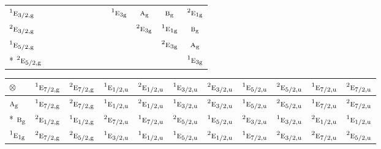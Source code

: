 \documentclass[10pt,a4paper]{article}
\numberwithin{equation}{section}
\newcommand{\irr}[1]{\text{\normalfont\scshape #1}}
\newcommand{\conjpair}[1]{{}^{#1}}
\newcommand{\ptag}[1]{\mathrm{#1}}
\newcommand{\irrprod}{\otimes}
\begin{document}
{\begin{longtable}{@{}lccccccccccc@{}}
$\conjpair{1}\irr{e}_{3/2,\ptag{g}}$ &  &  &  &  &  &  &  & $\conjpair{1}\irr{e}_{3\ptag{g}}$ & $\irr{a}_{\ptag{g}}$ & $\irr{b}_{\ptag{g}}$ & $\conjpair{2}\irr{e}_{1\ptag{g}}$\\
$\conjpair{2}\irr{e}_{3/2,\ptag{g}}$ &  &  &  &  &  &  &  &  & $\conjpair{2}\irr{e}_{3\ptag{g}}$ & $\conjpair{1}\irr{e}_{1\ptag{g}}$ & $\irr{b}_{\ptag{g}}$\\
$\conjpair{1}\irr{e}_{5/2,\ptag{g}}$ &  &  &  &  &  &  &  &  &  & $\conjpair{2}\irr{e}_{3\ptag{g}}$ & $\irr{a}_{\ptag{g}}$\\*
$\conjpair{2}\irr{e}_{5/2,\ptag{g}}$ &  &  &  &  &  &  &  &  &  &  & $\conjpair{1}\irr{e}_{3\ptag{g}}$\\
\bottomrule\end{longtable}}
{\small\setlength{\tabcolsep}{3pt}\begin{longtable}{@{}lcccccccccc@{}}\toprule
$\irrprod$ & $\conjpair{1}\irr{e}_{7/2,\ptag{g}}$ & $\conjpair{2}\irr{e}_{7/2,\ptag{g}}$ & $\conjpair{1}\irr{e}_{1/2,\ptag{u}}$ & $\conjpair{2}\irr{e}_{1/2,\ptag{u}}$ & $\conjpair{1}\irr{e}_{3/2,\ptag{u}}$ & $\conjpair{2}\irr{e}_{3/2,\ptag{u}}$ & $\conjpair{1}\irr{e}_{5/2,\ptag{u}}$ & $\conjpair{2}\irr{e}_{5/2,\ptag{u}}$ & $\conjpair{1}\irr{e}_{7/2,\ptag{u}}$ & $\conjpair{2}\irr{e}_{7/2,\ptag{u}}$\\\midrule\endhead
\bottomrule\endfoot\endlastfoot
$\irr{a}_{\ptag{g}}$ & $\conjpair{1}\irr{e}_{7/2,\ptag{g}}$ & $\conjpair{2}\irr{e}_{7/2,\ptag{g}}$ & $\conjpair{1}\irr{e}_{1/2,\ptag{u}}$ & $\conjpair{2}\irr{e}_{1/2,\ptag{u}}$ & $\conjpair{1}\irr{e}_{3/2,\ptag{u}}$ & $\conjpair{2}\irr{e}_{3/2,\ptag{u}}$ & $\conjpair{1}\irr{e}_{5/2,\ptag{u}}$ & $\conjpair{2}\irr{e}_{5/2,\ptag{u}}$ & $\conjpair{1}\irr{e}_{7/2,\ptag{u}}$ & $\conjpair{2}\irr{e}_{7/2,\ptag{u}}$\\*
$\irr{b}_{\ptag{g}}$ & $\conjpair{2}\irr{e}_{1/2,\ptag{g}}$ & $\conjpair{1}\irr{e}_{1/2,\ptag{g}}$ & $\conjpair{2}\irr{e}_{7/2,\ptag{u}}$ & $\conjpair{1}\irr{e}_{7/2,\ptag{u}}$ & $\conjpair{2}\irr{e}_{5/2,\ptag{u}}$ & $\conjpair{1}\irr{e}_{5/2,\ptag{u}}$ & $\conjpair{2}\irr{e}_{3/2,\ptag{u}}$ & $\conjpair{1}\irr{e}_{3/2,\ptag{u}}$ & $\conjpair{2}\irr{e}_{1/2,\ptag{u}}$ & $\conjpair{1}\irr{e}_{1/2,\ptag{u}}$\\
$\conjpair{1}\irr{e}_{1\ptag{g}}$ & $\conjpair{2}\irr{e}_{7/2,\ptag{g}}$ & $\conjpair{2}\irr{e}_{5/2,\ptag{g}}$ & $\conjpair{1}\irr{e}_{3/2,\ptag{u}}$ & $\conjpair{1}\irr{e}_{1/2,\ptag{u}}$ & $\conjpair{1}\irr{e}_{5/2,\ptag{u}}$ & $\conjpair{2}\irr{e}_{1/2,\ptag{u}}$ & $\conjpair{1}\irr{e}_{7/2,\ptag{u}}$ & $\conjpair{2}\irr{e}_{3/2,\ptag{u}}$ & $\conjpair{2}\irr{e}_{7/2,\ptag{u}}$ & $\conjpair{2}\irr{e}_{5/2,\ptag{u}}$\\

\end{longtable}}
\end{document}
